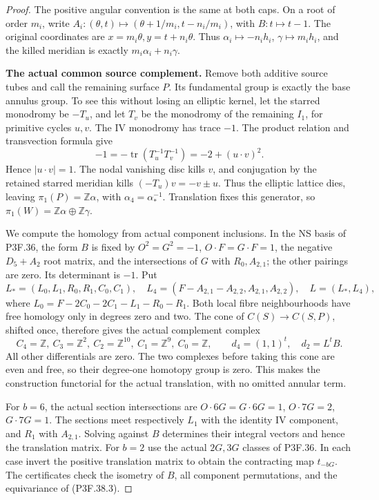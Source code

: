 \begin{proof}
The positive angular convention is the same at both caps. On a
root of order \(m_i\), write \(A_i:(\theta,t)\mapsto
(\theta+1/m_i,t-n_i/m_i)\), with \(B:t\mapsto t-1\).
The original coordinates are \(x=m_i\theta,y=t+n_i\theta\).
Thus \(\alpha_i\mapsto-n_ih_i\),
\(\gamma\mapsto m_ih_i\), and the killed meridian is exactly
\(m_i\alpha_i+n_i\gamma\).

\par\medskip\noindent\textbf{The actual common source complement.}
Remove both additive source tubes and call the remaining surface
\(P\). Its fundamental group is exactly the base annulus group.
To see this without losing an elliptic kernel, let the starred
monodromy be \(-T_u\), and let \(T_v\) be the monodromy of
the remaining \(I_1\), for primitive cycles \(u,v\). The IV
monodromy has trace \(-1\). The product relation and transvection
formula give
\[
 -1=-\operatorname{tr}(T_u^{-1}T_v^{-1})
                         =-2+(u\cdot v)^2.
\]
Hence \(|u\cdot v|=1\). The nodal vanishing disc kills \(v\),
and conjugation by the retained starred meridian kills
\((-T_u)v=-v\pm u\). Thus the elliptic lattice dies, leaving
\(\pi_1(P)=\mathbb Z\alpha\), with
\(\alpha_4=\alpha_*^{-1}\). Translation fixes this generator,
so \(\pi_1(W)=\mathbb Z\alpha\oplus\mathbb Z\gamma\).

We compute the homology from actual component inclusions. In the
NS basis of P3F.36, the form \(B\) is fixed by
\(O^2=G^2=-1\), \(O\cdot F=G\cdot F=1\), the negative
\(D_5+A_2\) root matrix, and the intersections of \(G\) with
\(R_0,A_{2,1}\); the other pairings are zero. Its determinant
is \(-1\). Put
\[
 L_*=(L_0,L_1,R_0,R_1,C_0,C_1),\quad
 L_4=(F-A_{2,1}-A_{2,2},A_{2,1},A_{2,2}),\quad L=(L_*,L_4),
\]
where \(L_0=F-2C_0-2C_1-L_1-R_0-R_1\).
Both local fibre neighbourhoods have free homology only in degrees
zero and two. The cone of \(C(S)\to C(S,P)\), shifted once,
therefore gives the actual complement complex
\[
 C_4=\mathbb Z,\ C_3=\mathbb Z^2,\ C_2=\mathbb Z^{10},
 \ C_1=\mathbb Z^9,\ C_0=\mathbb Z,
 \qquad d_4=(1,1)^t,\quad d_2=L^tB.                         \tag{P3F.38.3}
\]
All other differentials are zero. The two complexes before taking
this cone are even and free, so their degree-one homotopy group
is zero. This makes the construction functorial for the actual
translation, with no omitted annular term.

For \(b=6\), the actual section intersections are
\(O\cdot6G=G\cdot6G=1\), \(O\cdot7G=2\),
\(G\cdot7G=1\). The sections meet respectively \(L_1\)
with the identity IV component, and \(R_1\) with \(A_{2,1}\).
Solving against \(B\) determines their integral vectors and
hence the translation matrix. For \(b=2\) use the actual
\(2G,3G\) classes of P3F.36. In each case invert the positive
translation matrix to obtain the contracting map \(t_{-bG}\).
The certificates check the isometry of \(B\), all component
permutations, and the equivariance of (P3F.38.3).


\end{proof}

